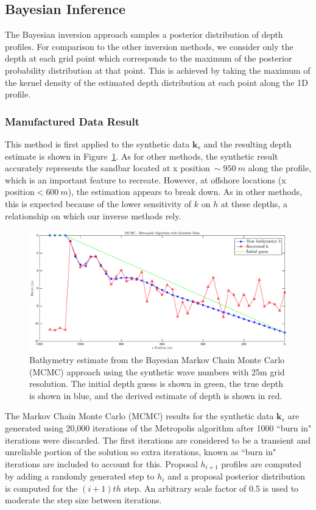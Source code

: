\subsection{Bayesian Inference} \label{BaysRes}
The Bayesian inversion approach samples a posterior distribution of depth profiles. For comparison to the other inversion methods, we consider only the depth at each grid point which corresponds to the maximum of the posterior probability distribution at that point. This is achieved by taking the maximum of the kernel density of the estimated depth distribution at each point along the 1D profile. 

\subsubsection{Manufactured Data Result}
This method is first applied to the synthetic data $\mathbf{k}_s$ and the resulting depth estimate is shown in Figure~\ref{mcmc-synthetic}. As for other methods, the synthetic result accurately represents the sandbar located at x position$~\sim950~m$ along the profile, which is an important feature to recreate. However, at offshore locations (x position$<600~m$), the estimation appears to break down. As in other methods, this is expected because of the lower sensitivity of $k$ on $h$ at these depths, a relationship on which our inverse methods rely.

\begin{figure}[H]
\center
\includegraphics[scale=0.46]{img/MCMC-manufactured.eps} 
\caption{Bathymetry estimate from the Bayesian Markov Chain Monte Carlo (MCMC) approach using the synthetic wave numbers with 25m grid resolution. The initial depth guess is shown in green, the true depth is shown in blue, and the derived estimate of depth is shown in red.}
\label{mcmc-synthetic}
\end{figure}

The Markov Chain Monte Carlo (MCMC) results for the synthetic data $\mathbf{k}_s$ are generated using 20,000 iterations of the Metropolis algorithm after 1000 ``burn in" iterations were discarded. The first iterations are considered to be a transient and unreliable portion of the solution so extra iterations, known as ``burn in" iterations are included to account for this. Proposal $h_{i+1}$ profiles are computed by adding a randomly generated step to $h_i$ and a proposal posterior distribution is computed for the $(i+1)th$ step. An arbitrary scale factor of 0.5 is used to moderate the step size between iterations. 

